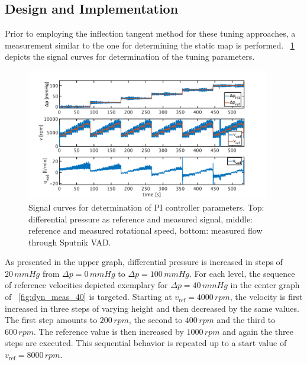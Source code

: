 \subsection{Design and Implementation}
Prior to employing the inflection tangent method for these tuning approaches, a measurement similar to the one for determining the static map is performed. \figurename~\ref{fig:dyn_meas} depicts the signal curves for determination of the tuning parameters.
\begin{figure}[ht]
  \centering
  \includegraphics[width=0.95\textwidth]{images/chapt_5/dyn_measure.pdf}
  \caption[Signal curves for determination of PI controller parameters]{Signal curves for determination of PI controller parameters. Top: differential pressure as reference and measured signal, middle: reference and measured rotational speed, bottom: measured flow through Sputnik VAD.}
  \label{fig:dyn_meas}
\end{figure}
As presented in the upper graph, differential pressure is increased in steps of $20\,mmHg$ from $\Delta{p}=0\,mmHg$ to $\Delta{p}=100\,mmHg$. For each level, the sequence of reference velocities depicted exemplary for $\Delta{p}=40\,mmHg$ in the center graph of \figurename~\ref{fig:dyn_meas_40} is targeted. Starting at $v_{\mathrm{ref}}=4000 \, rpm $, the velocity is first increased in three steps of varying height and then decreased by the same values. The first step amounts to $200 \, rpm$, the second to $400 \, rpm$ and the third to $600 \, rpm$. The reference value is then increased by $1000\,rpm$ and again the three steps are executed.
This sequential behavior is repeated up to a start value of $v_{\mathrm{ref}}=8000\,rpm$.
